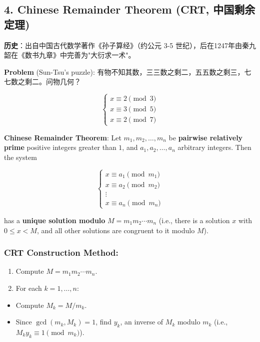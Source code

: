 \documentclass[10pt,a4paper,openany]{ctexbook}
\theoremstyle{definition}
\theoremstyle{remark}
\renewenvironment{quote}
  {\list{}{\leftmargin=1em\rightmargin=0pt\topsep=0.5pt\partopsep=0pt}\item[]}
  {\endlist}
\begin{document}
\vspace{-2pt}

\subsection{4. Chinese Remainder Theorem (CRT, 中国剩余定理)}

\begin{quote}
\textbf{历史}：出自中国古代数学著作《孙子算经》（约公元 3-5 世纪），后在1247年由秦九韶在《数书九章》中完善为"大衍求一术"。

\textbf{Problem} (Sun-Tsu's puzzle):
有物不知其数，三三数之剩二，五五数之剩三，七七数之剩二。问物几何？

\[
\begin{cases}
x \equiv 2 \pmod{3} \\
x \equiv 3 \pmod{5} \\
x \equiv 2 \pmod{7}
\end{cases}
\]


\textbf{Chinese Remainder Theorem}: Let $m_1, m_2, \dots, m_n$ be \textbf{pairwise relatively prime} positive integers greater than $1$, and $a_1, a_2, \dots, a_n$ arbitrary integers. Then the system

\[
\begin{cases}
x \equiv a_1 \pmod{m_1} \\
x \equiv a_2 \pmod{m_2} \\
\vdots \\
x \equiv a_n \pmod{m_n}
\end{cases}
\]


has a \textbf{unique solution modulo} $M = m_1 m_2 \cdots m_n$ (i.e., there is a solution $x$ with $0 \leq x < M$, and all other solutions are congruent to it modulo $M$).

\end{quote}

\subsubsection{CRT Construction Method:}

\begin{enumerate}
\item Compute $M = m_1 m_2 \cdots m_n$.
\item For each $k = 1, \dots, n$:
\end{enumerate}

\begin{itemize}
\item Compute $M_k = M / m_k$.
\item Since $\gcd(m_k, M_k) = 1$, find $y_k$, an inverse of $M_k$ modulo $m_k$ (i.e., $M_k y_k \equiv 1 \pmod{m_k}$).
\end{itemize}
\end{document}
